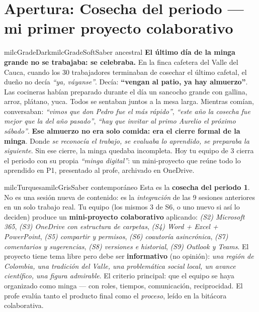 \documentclass[11pt,letterpaper]{article}
\begin{document}
\newpage

\section*{Apertura: Cosecha del periodo --- mi primer proyecto colaborativo}

\begin{softbox}{milcGradeDark}{milcGradeSoft}{Saber ancestral}
\textbf{El último día de la minga grande no se trabajaba: se celebraba.} En la finca cafetera del Valle del Cauca, cuando los 30 trabajadores terminaban de cosechar el último cafetal, el dueño no decía \emph{``ya, váyanse''}. Decía: \textbf{``vengan al patio, ya hay almuerzo''}. Las cocineras habían preparado durante el día un sancocho grande con gallina, arroz, plátano, yuca. Todos se sentaban juntos a la mesa larga. Mientras comían, conversaban: \emph{``vimos que don Pedro fue el más rápido''}, \emph{``este año la cosecha fue mejor que la del año pasado''}, \emph{``hay que invitar al primo Aurelio el próximo sábado''}. \textbf{Ese almuerzo no era solo comida: era el cierre formal de la minga}. Donde \emph{se reconocía el trabajo, se evaluaba lo aprendido, se preparaba la siguiente}. Sin ese cierre, la minga quedaba incompleta. Hoy tu equipo de 3 cierra el periodo con su propia \emph{``minga digital''}: un mini-proyecto que reúne todo lo aprendido en P1, presentado al profe, archivado en OneDrive.
\end{softbox}

\begin{softbox}{milcTurquesa}{milcGris}{Saber contemporáneo}
Esta es la \textbf{cosecha del periodo 1}. No es una sesión nueva de contenido: es la \emph{integración} de las 9 sesiones anteriores en un solo trabajo real. Tu equipo (los mismos 3 de S6, o uno nuevo si así lo deciden) produce un \textbf{mini-proyecto colaborativo} aplicando: \emph{(S2) Microsoft 365}, \emph{(S3) OneDrive con estructura de carpetas}, \emph{(S4) Word + Excel + PowerPoint}, \emph{(S5) compartir y permisos}, \emph{(S6) coautoría asincrónica}, \emph{(S7) comentarios y sugerencias}, \emph{(S8) versiones e historial}, \emph{(S9) Outlook y Teams}. El proyecto tiene tema libre pero debe ser \textbf{informativo} (no opinión): \emph{una región de Colombia, una tradición del Valle, una problemática social local, un avance científico, una figura admirable}. El criterio principal: que el equipo se haya organizado como minga --- con roles, tiempos, comunicación, reciprocidad. El profe evalúa tanto el producto final como el \emph{proceso}, leído en la bitácora colaborativa.
\end{softbox}
\end{document}
